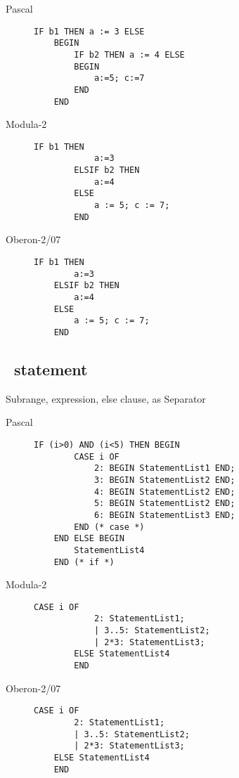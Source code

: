 \documentclass[10pt]{article}
\begin{document}
\begin{description}
    \item[Pascal] 
    \begin{lstlisting}[style=example]   
    IF b1 THEN a := 3 ELSE 
    BEGIN
        IF b2 THEN a := 4 ELSE 
        BEGIN
            a:=5; c:=7 
        END
    END
    \end{lstlisting}
    
    \item[Modula-2] 
        \begin{lstlisting}[style=example]   
        IF b1 THEN 
            a:=3
        ELSIF b2 THEN 
            a:=4
        ELSE
            a := 5; c := 7;
        END
        \end{lstlisting}
    
    \item[Oberon-2/07] 
    \begin{lstlisting}[style=example]   
    IF b1 THEN 
        a:=3
    ELSIF b2 THEN 
        a:=4
    ELSE
        a := 5; c := 7;
    END
    \end{lstlisting}
\end{description}

\subsection{\CASE\ statement}
Subrange, expression, else clause, \textbar as Separator

\begin{description}
    \item[Pascal] 
    \begin{lstlisting}[style=example]   
    IF (i>0) AND (i<5) THEN BEGIN 
        CASE i OF
            2: BEGIN StatementList1 END;
            3: BEGIN StatementList2 END;
            4: BEGIN StatementList2 END;
            5: BEGIN StatementList2 END;
            6: BEGIN StatementList3 END;
        END (* case *) 
    END ELSE BEGIN
        StatementList4 
    END (* if *)
    \end{lstlisting}
    
    \item[Modula-2] 
        \begin{lstlisting}[style=example]   
        CASE i OF
            2: StatementList1;
            | 3..5: StatementList2;
            | 2*3: StatementList3;
        ELSE StatementList4
        END
        \end{lstlisting}
    
    \item[Oberon-2/07] 
    \begin{lstlisting}[style=example]   
    CASE i OF
        2: StatementList1;
        | 3..5: StatementList2;
        | 2*3: StatementList3;
    ELSE StatementList4
    END
    \end{lstlisting}
\end{description}
\end{document}
